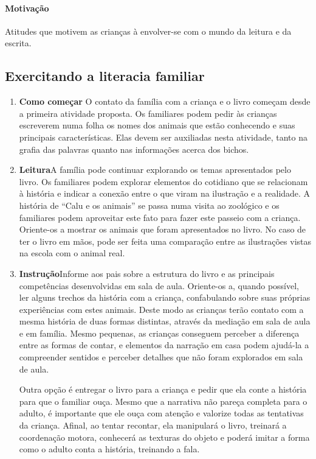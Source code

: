 \documentclass[11pt]{extarticle}
\begin{document}
\paragraph{Motivação} Atitudes que motivem as crianças à envolver-se com 
o mundo da leitura e da escrita.

\subsection{Exercitando a literacia familiar}



\begin{enumerate}
\item \textbf{Como começar}\quad 
O contato da família com a criança e o livro começam desde a primeira atividade proposta.
Os familiares podem pedir às crianças escreverem numa folha
os nomes dos animais que estão conhecendo e suas principais características.
Elas devem ser auxiliadas nesta atividade, tanto na grafia das
palavras quanto nas informações acerca dos bichos. 
\item \textbf{Leitura}\quad A família pode continuar 
explorando os temas apresentados pelo livro. Os familiares podem explorar 
elementos do cotidiano que se relacionam à história e indicar a conexão 
entre o que viram na ilustração e a realidade. A história de ``Calu e os animais'' 
se passa numa visita ao zoológico e os familiares podem aproveitar este fato 
para fazer este passeio com a criança. Oriente-os a mostrar os animais
que foram apresentados no livro. No caso de ter o livro em mãos, 
pode ser feita uma comparação entre as ilustrações vistas na escola
com o animal real. 

\item \textbf{Instrução}\quad Informe aos pais sobre a estrutura do livro 
e as principais competências desenvolvidas em sala de aula. Oriente-os a, 
quando possível, ler alguns trechos da história com a criança, confabulando 
sobre suas próprias experiências com estes animais.
Deste modo as crianças terão contato com a mesma história de duas formas 
distintas, através da mediação em sala de aula e em família. 
Mesmo pequenas, as crianças conseguem perceber a diferença entre 
as formas de contar, e elementos da narração em casa podem ajudá-la a compreender 
sentidos e perceber detalhes que não foram explorados em sala de aula. 

Outra opção é entregar o livro para a criança e pedir que ela conte 
a história para que o familiar ouça. Mesmo que a narrativa não pareça 
completa para o adulto, é importante que ele ouça com atenção e 
valorize todas as tentativas da criança. Afinal, ao tentar recontar, 
ela manipulará o livro, treinará a coordenação motora, conhecerá as texturas 
do objeto e poderá imitar a forma como o adulto 
conta a história, treinando a fala. 
\end{enumerate}
\end{document}
